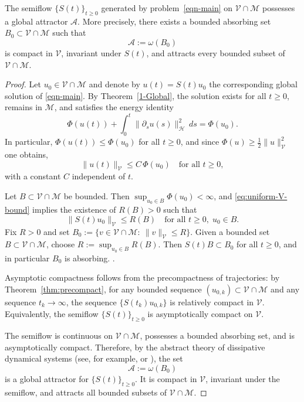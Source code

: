 \documentclass[reqno]{amsart}
\begin{document}
\begin{theorem}\label{thm:attractor-existence}
The semiflow $\{S(t)\}_{t\ge0}$ generated by problem~\eqref{eqn-main} on
$\mathcal V\cap\mathcal M$ possesses a global attractor $\mathcal A$.
More precisely, there exists a bounded absorbing set
$B_0\subset\mathcal V\cap\mathcal M$ such that
\[
\mathcal A:=\omega(B_0)
\]
is compact in $\mathcal V$, invariant under $S(t)$, and attracts every bounded
subset of $\mathcal V\cap\mathcal M$.
\end{theorem}

\begin{proof}
Let $u_0\in\mathcal V\cap\mathcal M$ and denote by $u(t)=S(t)u_0$ the corresponding
global solution of \eqref{eqn-main}. By Theorem~\ref{1-Global}, the solution exists
for all $t\ge0$, remains in $\mathcal M$, and satisfies the energy identity
\[
\Phi(u(t))+\int_0^t\|\partial_s u(s)\|_{\mathcal H}^2\,ds=\Phi(u_0).
\]
In particular, $\Phi(u(t))\le \Phi(u_0)$ for all $t\ge0$, and since
$\Phi(u)\ge \frac12\|u\|_{\mathcal V}^2$ one obtains,
\begin{equation}\label{eq:uniform-V-bound}
\|u(t)\|_{\mathcal V}\le C\,\Phi(u_0)\quad\text{for all }t\ge0,
\end{equation}
with a constant $C$ independent of $t$.

Let $B\subset\mathcal V\cap\mathcal M$ be bounded. Then
$\sup_{u_0\in B}\Phi(u_0)<\infty$, and \eqref{eq:uniform-V-bound} implies the
existence of $R(B)>0$ such that
\[
\|S(t)u_0\|_{\mathcal V}\le R(B)\quad\text{for all }t\ge0,\; u_0\in B.
\]
Fix $R>0$ and set $B_0:=\{v\in\mathcal V\cap\mathcal M:\ \|v\|_{\mathcal V}\le R\}$.
Given a bounded set $B\subset\mathcal V\cap\mathcal M$, choose $R:=\sup_{u_0\in B}R(B)$.
Then $S(t)B\subset B_0$ for all $t\ge0$, and in particular $B_0$ is absorbing.
.

Asymptotic compactness follows from the precompactness of trajectories:
by Theorem~\ref{thm:precompact}, for any bounded sequence
$(u_{0,k})\subset\mathcal V\cap\mathcal M$ and any sequence $t_k\to\infty$, the
sequence $\{S(t_k)u_{0,k}\}$ is relatively compact in $\mathcal V$. Equivalently,
the semiflow $\{S(t)\}_{t\ge0}$ is asymptotically compact on $\mathcal V$.

The semiflow is continuous on $\mathcal V\cap\mathcal M$, possesses a bounded
absorbing set, and is asymptotically compact. Therefore, by the abstract theory
of dissipative dynamical systems (see, for example,
\cite[Theorem~I.1.1]{R.Temam} or \cite[Theorem~2.4]{Chueshov}),
the set
\[
\mathcal A:=\omega(B_0)
\]
is a global attractor for $\{S(t)\}_{t\ge0}$. It is compact in $\mathcal V$,
invariant under the semiflow, and attracts all bounded subsets of
$\mathcal V\cap\mathcal M$.
\end{proof}
\end{document}
